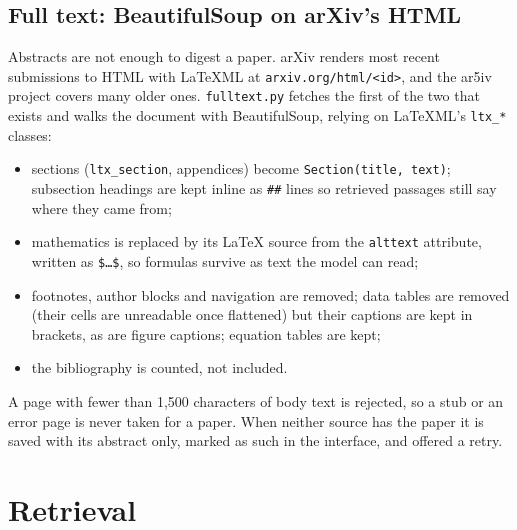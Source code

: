 \documentclass[11pt,a4paper]{article}
\newcommand{\code}[1]{\texttt{#1}}
\begin{document}
\subsection{Full text: BeautifulSoup on arXiv's HTML}
Abstracts are not enough to digest a paper. arXiv renders most recent submissions to HTML with LaTeXML at
\code{arxiv.org/html/<id>}, and the ar5iv project covers many older ones. \code{fulltext.py} fetches the first
of the two that exists and walks the document with BeautifulSoup, relying on LaTeXML's \code{ltx\_*} classes:
\begin{itemize}
\item sections (\code{ltx\_section}, appendices) become \code{Section(title, text)}; subsection headings are
  kept inline as \code{\#\#} lines so retrieved passages still say where they came from;
\item mathematics is replaced by its LaTeX source from the \code{alttext} attribute, written as
  \code{\$\ldots\$}, so formulas survive as text the model can read;
\item footnotes, author blocks and navigation are removed; data tables are removed (their cells are
  unreadable once flattened) but their captions are kept in brackets, as are figure captions; equation
  tables are kept;
\item the bibliography is counted, not included.
\end{itemize}
A page with fewer than 1,500 characters of body text is rejected, so a stub or an error page is never taken
for a paper. When neither source has the paper it is saved with its abstract only, marked as such in the
interface, and offered a retry.

\section{Retrieval}\label{sec:retrieval}
\end{document}
